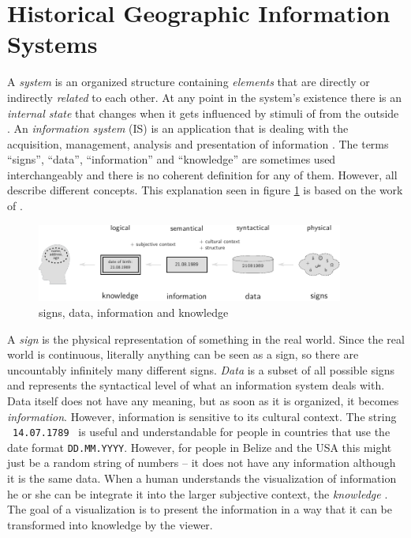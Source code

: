 

\section{Historical Geographic Information Systems} %
\label{sec:historical_geographic_information_systems}

A \emph{system} is an organized structure containing \emph{elements} that are directly or indirectly \emph{related} to each other. At any point in the system's existence there is an \emph{internal state} that changes when it gets influenced by stimuli of from the outside \cite{system}. An \emph{information system} (IS) is an application that is dealing with the acquisition, management, analysis and presentation of information \cite{informationSystem}. The terms ``signs'', ``data'', ``information'' and ``knowledge'' are sometimes used interchangeably and there is no coherent definition for any of them. However, all describe different concepts. This explanation seen in figure \ref{fig:information} is based on the work of \cite{datinfwis}.

\begin{figure}[ht]
  \vspace{1em}
  \begin{center}
    \includegraphics[width=0.9\textwidth]{graphics/basics/hgis/information}
  \end{center}
  \caption{signs, data, information and knowledge}
  \label{fig:information}
\end{figure}

A \emph{sign} is the physical representation of something in the real world. Since the real world is continuous, literally anything can be seen as a sign, so there are uncountably infinitely many different signs. \emph{Data} is a subset of all possible signs and represents the syntactical level of what an information system deals with. Data itself does not have any meaning, but as soon as it is organized, it becomes \emph{information}. However, information is sensitive to its cultural context. The string ~\texttt{14.07.1789}~ is useful and understandable for people in countries that use the date format \texttt{DD.MM.YYYY}. However, for people in Belize and the USA this might just be a random string of numbers -- it does not have any  information although it is the same data. When a human understands the visualization of information he or she can be integrate it into the larger subjective context, the \emph{knowledge} \cite{nake}. The goal of a visualization is to present the information in a way that it can be transformed into knowledge by the viewer.

